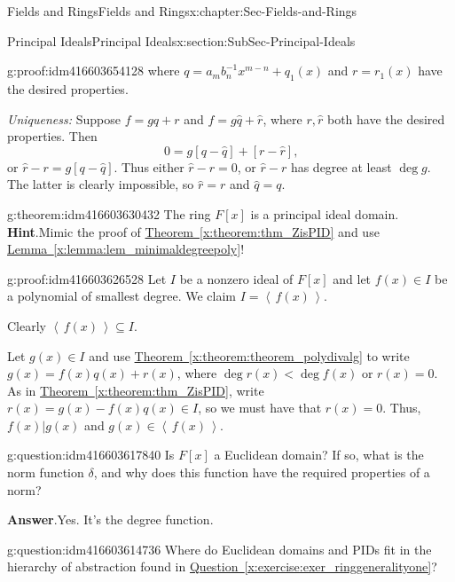 \documentclass[oneside,10pt,]{book}
\numberwithin{equation}{section}
\newcommand{\ideal}[1]{\left\langle\, #1 \,\right\rangle}
\newcommand{\lt}{<}
\begin{document}
\begin{chapterptx}{Fields and Rings}{}{Fields and Rings}{}{}{x:chapter:Sec-Fields-and-Rings}
\begin{sectionptx}{Principal Ideals}{}{Principal Ideals}{}{}{x:section:SubSec-Principal-Ideals}
\begin{proofptx}{}{g:proof:idm416603654128}
where \(q = a_m b_n^{-1} x^{m-n} + q_1(x)\) and \(r = r_1(x)\) have the desired properties.%
\par
\emph{Uniqueness:} Suppose \(f = gq + r\) and \(f = g\hat{q} + \hat{r}\), where \(r,\hat{r}\) both have the desired properties. Then%
\begin{equation*}
0 = g[q - \hat{q}] + [r - \hat{r}]\text{,}
\end{equation*}
or \(\hat{r} - r = g [q - \hat{q}]\). Thus either \(\hat{r} - r = 0\), or \(\hat{r} - r\) has degree at least \(\deg g\). The latter is clearly impossible, so \(\hat{r} = r\) and \(\hat{q} = q\).%
\end{proofptx}
\begin{theorem}{}{}{g:theorem:idm416603630432}%
The ring \(F[x]\) is a principal ideal domain.%
\textbf{Hint}.\quad{}Mimic the proof of \hyperref[x:theorem:thm_ZisPID]{Theorem~\ref{x:theorem:thm_ZisPID}} and use \hyperref[x:lemma:lem_minimaldegreepoly]{Lemma~\ref{x:lemma:lem_minimaldegreepoly}}!%
\end{theorem}
\begin{proofptx}{}{g:proof:idm416603626528}
Let \(I\) be a nonzero ideal of \(F[x]\) and let \(f(x)\in I\) be a polynomial of smallest degree. We claim \(I = \ideal{f(x)}\).%
\par
Clearly \(\ideal{f(x)}\subseteq I\).%
\par
Let \(g(x)\in I\) and use \hyperref[x:theorem:theorem_polydivalg]{Theorem~\ref{x:theorem:theorem_polydivalg}} to write \(g(x) = f(x) q(x) + r(x)\), where \(\deg r(x) \lt \deg f(x)\) or \(r(x) = 0\). As in \hyperref[x:theorem:thm_ZisPID]{Theorem~\ref{x:theorem:thm_ZisPID}}, write \(r(x) = g(x) - f(x) q(x) \in I\), so we must have that \(r(x) = 0\). Thus, \(f(x) | g(x)\) and \(g(x)\in \ideal{f(x)}\).%
\end{proofptx}
\begin{question}{}{g:question:idm416603617840}%
Is \(F[x]\) a Euclidean domain? If so, what is the norm function \(\delta\), and why does this function have the required properties of a norm?%
\par\smallskip%
\noindent\textbf{Answer}.\hypertarget{g:answer:idm416603615760}{}\quad{}Yes. It's the degree function.%
\end{question}
\begin{question}{}{g:question:idm416603614736}%
Where do Euclidean domains and PIDs fit in the hierarchy of abstraction found in \hyperref[x:exercise:exer_ringgeneralityone]{Question~\ref{x:exercise:exer_ringgeneralityone}}?%
\end{question}
\end{sectionptx}
\end{chapterptx}
\end{document}
